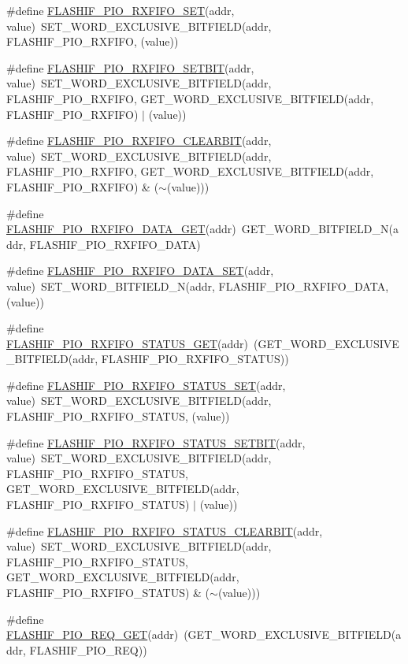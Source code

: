 \begin{DoxyCompactItemize}
\item 
\#define \hyperlink{a00551_a784576c2c4344bbdf77f15d28aefc11f}{FLASHIF\_\-PIO\_\-RXFIFO\_\-SET}(addr, value)~SET\_\-WORD\_\-EXCLUSIVE\_\-BITFIELD(addr, FLASHIF\_\-PIO\_\-RXFIFO, (value))
\item 
\#define \hyperlink{a00551_a6a4754f07638e8f65f0bd28a0396f5e4}{FLASHIF\_\-PIO\_\-RXFIFO\_\-SETBIT}(addr, value)~SET\_\-WORD\_\-EXCLUSIVE\_\-BITFIELD(addr, FLASHIF\_\-PIO\_\-RXFIFO, GET\_\-WORD\_\-EXCLUSIVE\_\-BITFIELD(addr, FLASHIF\_\-PIO\_\-RXFIFO) $|$ (value))
\item 
\#define \hyperlink{a00551_ab93a98e231268dfb6ef031bd7c1d41f4}{FLASHIF\_\-PIO\_\-RXFIFO\_\-CLEARBIT}(addr, value)~SET\_\-WORD\_\-EXCLUSIVE\_\-BITFIELD(addr, FLASHIF\_\-PIO\_\-RXFIFO, GET\_\-WORD\_\-EXCLUSIVE\_\-BITFIELD(addr, FLASHIF\_\-PIO\_\-RXFIFO) \& ($\sim$(value)))
\item 
\#define \hyperlink{a00551_a07701298f3399a47127ca5533552b1da}{FLASHIF\_\-PIO\_\-RXFIFO\_\-DATA\_\-GET}(addr)~GET\_\-WORD\_\-BITFIELD\_\-N(addr, FLASHIF\_\-PIO\_\-RXFIFO\_\-DATA)
\item 
\#define \hyperlink{a00551_a3013394beb609c8f0f61a8d8ba704495}{FLASHIF\_\-PIO\_\-RXFIFO\_\-DATA\_\-SET}(addr, value)~SET\_\-WORD\_\-BITFIELD\_\-N(addr, FLASHIF\_\-PIO\_\-RXFIFO\_\-DATA, (value))
\item 
\#define \hyperlink{a00551_a0cfde095734d7146d7d692bcd1521784}{FLASHIF\_\-PIO\_\-RXFIFO\_\-STATUS\_\-GET}(addr)~(GET\_\-WORD\_\-EXCLUSIVE\_\-BITFIELD(addr, FLASHIF\_\-PIO\_\-RXFIFO\_\-STATUS))
\item 
\#define \hyperlink{a00551_ae0750404620b277e4bc25a745308f86e}{FLASHIF\_\-PIO\_\-RXFIFO\_\-STATUS\_\-SET}(addr, value)~SET\_\-WORD\_\-EXCLUSIVE\_\-BITFIELD(addr, FLASHIF\_\-PIO\_\-RXFIFO\_\-STATUS, (value))
\item 
\#define \hyperlink{a00551_ae6e6cda753b322506fa30b4ec3192ba9}{FLASHIF\_\-PIO\_\-RXFIFO\_\-STATUS\_\-SETBIT}(addr, value)~SET\_\-WORD\_\-EXCLUSIVE\_\-BITFIELD(addr, FLASHIF\_\-PIO\_\-RXFIFO\_\-STATUS, GET\_\-WORD\_\-EXCLUSIVE\_\-BITFIELD(addr, FLASHIF\_\-PIO\_\-RXFIFO\_\-STATUS) $|$ (value))
\item 
\#define \hyperlink{a00551_acf84531a1b007533213d049df1af7df5}{FLASHIF\_\-PIO\_\-RXFIFO\_\-STATUS\_\-CLEARBIT}(addr, value)~SET\_\-WORD\_\-EXCLUSIVE\_\-BITFIELD(addr, FLASHIF\_\-PIO\_\-RXFIFO\_\-STATUS, GET\_\-WORD\_\-EXCLUSIVE\_\-BITFIELD(addr, FLASHIF\_\-PIO\_\-RXFIFO\_\-STATUS) \& ($\sim$(value)))
\item 
\#define \hyperlink{a00551_abdbd735d176f808b18168e82ce21a57b}{FLASHIF\_\-PIO\_\-REQ\_\-GET}(addr)~(GET\_\-WORD\_\-EXCLUSIVE\_\-BITFIELD(addr, FLASHIF\_\-PIO\_\-REQ))

\end{DoxyCompactItemize}
